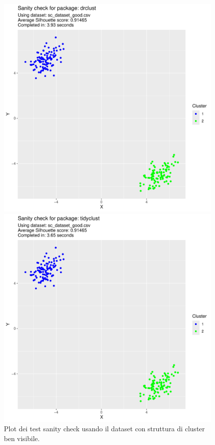 \documentclass[12pt]{report}
\begin{document}
\begin{figure}[h]
\begin{boxedminipage}{0.5\textwidth}
					\includegraphics[width = \textwidth, page = 1]{results/results_DRCLUST.pdf}
				\end{boxedminipage}
				\begin{boxedminipage}{0.5\textwidth}
					\includegraphics[width = \textwidth, page = 1]{results/results_TIDYCLUST.pdf}
				\end{boxedminipage}
				\begin{boxedminipage}{0.5\textwidth}
				\end{boxedminipage}
				\caption{Plot dei test sanity check usando il dataset con struttura di cluster
				ben visibile.}
				\label{fig:good}
			\end{figure}
\end{document}
